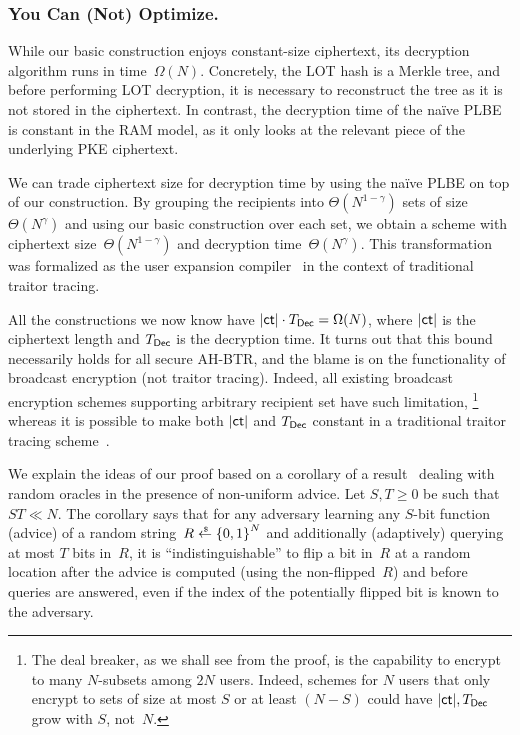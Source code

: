 \subsubsection{You Can (Not) Optimize.}
While our basic construction enjoys constant-size ciphertext,
its decryption algorithm runs in time~$\Omega(N)$.
Concretely, the LOT hash is a Merkle tree, and before performing LOT decryption, it is necessary to reconstruct the tree as it is not stored in the ciphertext.
In contrast, the decryption time of the na{\"i}ve PLBE is constant in the RAM model, as it only looks at the relevant piece of the underlying PKE ciphertext.

We can trade ciphertext size for decryption time by using the na{\"i}ve PLBE on top of our construction.
By grouping the recipients into $\Theta(N^{1-\gamma})$ sets of size~$\Theta(N^\gamma)$ and using our basic construction over each set, we obtain a scheme with ciphertext size~$\Theta(N^{1-\gamma})$ and decryption time~$\Theta(N^\gamma)$.
This transformation was formalized as the user expansion compiler~\cite{C:Zhandry20} in the context of traditional traitor tracing.

All the constructions we now know have ${|\ct|\cdot\TDec=\Omega(N)}$,
where $|\ct|$ is the ciphertext length and $\TDec$ is the decryption time.
It turns out that this bound necessarily holds for all secure AH-BTR, and
the blame is on the functionality of broadcast encryption (not traitor tracing).
Indeed, all existing broadcast encryption schemes supporting arbitrary recipient set have such limitation,%
\footnote{The deal breaker, as we shall see from the proof, is the capability to encrypt to many $N$-subsets among $2N$ users.
Indeed, schemes for $N$ users that only encrypt to sets of size at most $S$ or at least $({N-S})$ could have $|\ct|,\TDec$ grow with $S$, not~$N$.}
whereas
it is possible to make both $|\ct|$ and $\TDec$ constant in a traditional traitor tracing scheme~\cite{C:BonZha14}.

We explain the ideas of our proof based on a corollary of a result~\cite{C:Unruh07} dealing with random oracles in the presence of non-uniform advice.
Let ${S,T\geq 0}$ be such that ${ST\ll N}$.
The corollary says that
for any adversary learning any $S$-bit function (advice) of a random string~${R\draws\bit^N}$ and additionally (adaptively) querying at most $T$ bits in~$R$,
it is ``indistinguishable'' to flip a bit in~$R$ at a random location
after the advice is computed (using the non-flipped~$R$) and
before queries are answered,
even if the index of the potentially flipped bit is known to the adversary.

